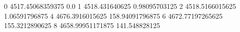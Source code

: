 0 4517.45068359375 0.0
1 4518.431640625 0.98095703125
2 4518.5166015625 1.06591796875
4 4676.3916015625 158.94091796875
6 4672.77197265625 155.3212890625
8 4658.99951171875 141.548828125
